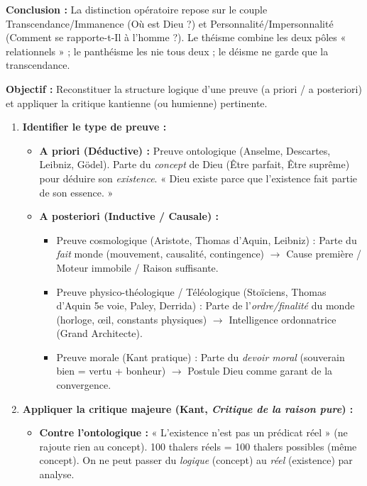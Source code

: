 \documentclass[11pt]{article}
\newcommand{\cle}[1]{{\popxbold\color{popdark}#1}}
\begin{document}
\begin{exoresolu}
\textbf{Conclusion :} La distinction opératoire repose sur le couple \cle{Transcendance/Immanence} (Où est Dieu ?) et \cle{Personnalité/Impersonnalité} (Comment se rapporte-t-Il à l'homme ?). Le théisme combine les deux pôles « relationnels » ; le panthéisme les nie tous deux ; le déisme ne garde que la transcendance.
\end{exoresolu}

\begin{methode}
\textbf{Objectif :} Reconstituer la structure logique d'une preuve (a priori / a posteriori) et appliquer la critique kantienne (ou humienne) pertinente.
\begin{enumerate}
    \item \textbf{Identifier le type de preuve :}
    \begin{itemize}
        \item \textbf{A priori (Déductive) :} \cle{Preuve ontologique} (Anselme, Descartes, Leibniz, Gödel). Parte du \emph{concept} de Dieu (Être parfait, Être suprême) pour déduire son \emph{existence}. « Dieu existe parce que l'existence fait partie de son essence. »
        \item \textbf{A posteriori (Inductive / Causale) :}
        \begin{itemize}
            \item \cle{Preuve cosmologique} (Aristote, Thomas d'Aquin, Leibniz) : Parte du \emph{fait} monde (mouvement, causalité, contingence) $\rightarrow$ Cause première / Moteur immobile / Raison suffisante.
            \item \cle{Preuve physico-théologique / Téléologique} (Stoïciens, Thomas d'Aquin 5e voie, Paley, Derrida) : Parte de l'\emph{ordre/finalité} du monde (horloge, œil, constants physiques) $\rightarrow$ Intelligence ordonnatrice (Grand Architecte).
            \item \cle{Preuve morale} (Kant pratique) : Parte du \emph{devoir moral} (souverain bien = vertu + bonheur) $\rightarrow$ Postule Dieu comme garant de la convergence.
        \end{itemize}
    \end{itemize}
    \item \textbf{Appliquer la critique majeure (Kant, \emph{Critique de la raison pure}) :}
    \begin{itemize}
        \item \textbf{Contre l'ontologique :} « L'existence n'est pas un prédicat réel » (ne rajoute rien au concept). 100 thalers réels = 100 thalers possibles (même concept). On ne peut passer du \emph{logique} (concept) au \emph{réel} (existence) par analyse.

\end{itemize}
\end{enumerate}
\end{methode}
\end{document}
